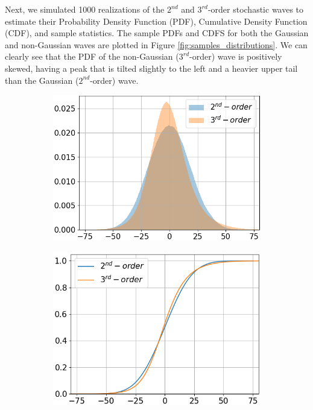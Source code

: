 \documentclass[preprint, review, 12pt]{elsarticle}
\begin{document}
Next, we simulated 1000 realizations of the $2^{nd}$ and $3^{rd}$-order stochastic waves to estimate their Probability Density Function (PDF), Cumulative Density Function (CDF), and sample statistics. The sample PDFs and CDFS for both the Gaussian and non-Gaussian waves are plotted in Figure \ref{fig:samples_distributions}. We can clearly see that the PDF of the non-Gaussian ($3^{rd}$-order) wave is positively skewed, having a peak that is tilted slightly to the left and a heavier upper tail than the Gaussian ($2^{nd}$-order) wave.

\captionsetup[subfigure]{font=small,skip=-15pt}
\captionsetup[figure]{font=small,skip=0pt}

\begin{figure}[!ht]
\centering
\begin{subfigure}{.49\textwidth}
  \centering
  \includegraphics[width=1.0\linewidth]{plots/samples_pdf.png}
  \label{fig:sample_pdf}
  \caption{}
 \end{subfigure}
 \begin{subfigure}{.46\textwidth}
  \centering
  \includegraphics[width=1.0\linewidth]{plots/samples_cdf.png}

\end{subfigure}
\end{figure}
\end{document}
